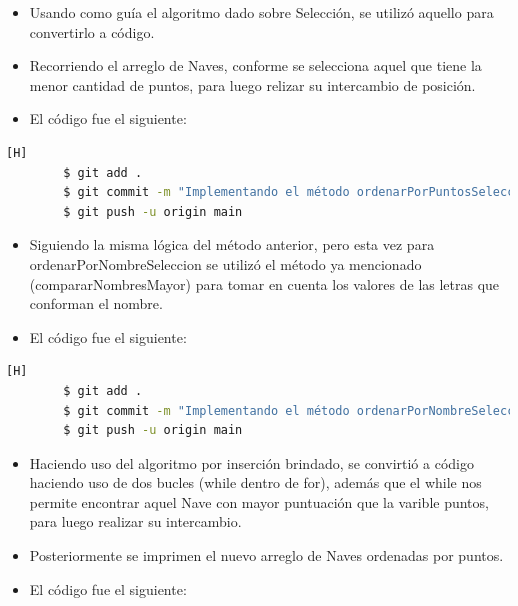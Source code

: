 \documentclass{article}
\begin{document}
 \begin{itemize}	
        \item Usando como guía el algoritmo dado sobre Selección, se utilizó aquello para convertirlo a código.
        \item Recorriendo el arreglo de Naves, conforme se selecciona aquel que tiene la menor cantidad de puntos, para luego relizar su intercambio de posición.
	\item El código fue el siguiente:
    \end{itemize}
    
    
    \begin{lstlisting}[language=bash,caption={Commit: Implementando el método ordenarPorPuntosSeleccion usando el algoritmo proporcionado y el método intercambiar}][H]
		$ git add .
		$ git commit -m "Implementando el método ordenarPorPuntosSeleccion usando el algoritmo proporcionado y el método intercambiar"			
		$ git push -u origin main
	\end{lstlisting}


 \begin{itemize}	
        \item Siguiendo la misma lógica del método anterior, pero esta vez para ordenarPorNombreSeleccion se utilizó el método ya mencionado (compararNombresMayor) para tomar en cuenta los valores de las letras que conforman el nombre.
	\item El código fue el siguiente:
    \end{itemize}
    
    
    \begin{lstlisting}[language=bash,caption={Commit: Implementando el método ordenarPorNombreSeleccion usando el algoritmo dado, además del método compararNombresMayor creado anteriormente}][H]
		$ git add .
		$ git commit -m "Implementando el método ordenarPorNombreSeleccion usando el algoritmo dado, además del método compararNombresMayor creado anteriormente"			
		$ git push -u origin main
	\end{lstlisting}


 \begin{itemize}	
        \item Haciendo uso del algoritmo por inserción brindado, se convirtió a código haciendo uso de dos bucles (while dentro de for), además que el while nos permite encontrar aquel Nave con mayor puntuación que la varible puntos, para luego realizar su intercambio.
        \item Posteriormente se imprimen el nuevo arreglo de Naves ordenadas por puntos.
	\item El código fue el siguiente:
    \end{itemize}
    
    
\end{document}
